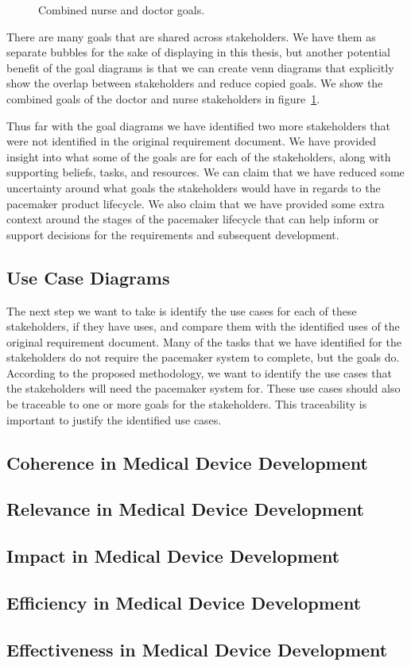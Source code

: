 \begin{figure}
	\centering
	
	\caption{Combined nurse and doctor goals.}
	\label{fig:nurse_doctor_combined}
\end{figure}

There are many goals that are shared across stakeholders. We have them as separate bubbles for the sake of displaying in this thesis, but another potential benefit of the goal diagrams is that we can create venn diagrams that explicitly show the overlap between stakeholders and reduce copied goals. We show the combined goals of the doctor and nurse stakeholders in figure~\ref{fig:nurse_doctor_combined}.

Thus far with the goal diagrams we have identified two more stakeholders that were not identified in the original requirement document. We have provided insight into what some of the goals are for each of the stakeholders, along with supporting beliefs, tasks, and resources. We can claim that we have reduced some uncertainty around what goals the stakeholders would have in regards to the pacemaker product lifecycle. We also claim that we have provided some extra context around the stages of the pacemaker lifecycle that can help inform or support decisions for the requirements and subsequent development.

\subsection{Use Case Diagrams}

The next step we want to take is identify the use cases for each of these stakeholders, if they have uses, and compare them with the identified uses of the original requirement document. Many of the tasks that we have identified for the stakeholders do not require the pacemaker system to complete, but the goals do. According to the proposed methodology, we want to identify the use cases that the stakeholders will need the pacemaker system for. These use cases should also be traceable to one or more goals for the stakeholders. This traceability is important to justify the identified use cases.

\subsection{Coherence in Medical Device Development}

\subsection{Relevance in Medical Device Development}

\subsection{Impact in Medical Device Development}

\subsection{Efficiency in Medical Device Development}

\subsection{Effectiveness in Medical Device Development}